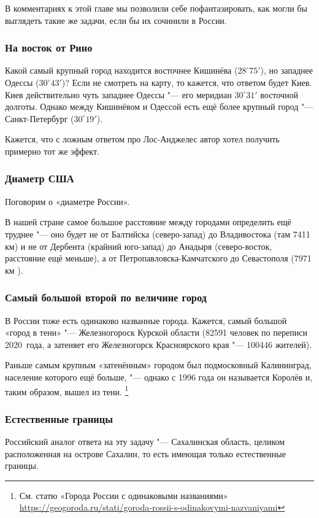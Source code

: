 \documentclass[twoside]{book}
\begin{document}
В комментариях к этой главе мы позволили себе пофантазировать, как могли бы выглядеть такие же задачи, если бы их сочинили в России.

\subsubsection*{На восток от Рино}
Какой самый крупный город находится восточнее Кишинёва ($28^\circ75'$), но западнее Одессы ($30^\circ43'$)? 
Если не смотреть на карту, то кажется, что ответом будет Киев. Киев действительно чуть западнее Одессы "--- его
меридиан $30^\circ31'$ восточной долготы.
Однако между Кишинёвом и Одессой есть ещё более крупный город "--- Санкт-Петербург
($30^\circ19'$).

Кажется, что с ложным ответом про Лос-Анджелес автор хотел получить примерно тот же эффект.


\subsubsection{Диаметр США}
Поговорим о «диаметре России». 

В нашей стране самое большое расстояние между городами определить ещё труднее "--- оно будет не от Балтийска 
(северо-запад) до Владивостока (там 7411 км) и не от Дербента (крайний юго-запад) до Анадыря (северо-восток, 
расстояние ещё меньше), а от Петропавловска-Камчатского до Севастополя (7971 км%
).


\subsubsection{Самый большой второй по величине город}
В России тоже есть одинаково названные города. 
Кажется, самый большой «город в тени» "--- Железногороск Курской области (82591 человек по переписи 2020~года, 
а затеняет его Железногорск Красноярского края "--- 100446 жителей). 

Раньше самым крупным «затенённым» городом был подмосковный Калининград, население которого ещё больше, "---
однако с 1996 года он называется Королёв и, таким образом, вышел из тени.%
\footnote{См. статю «Города России с одинаковыми названиями» \url{https://geogoroda.ru/stati/goroda-rossii-s-odinakovymi-nazvaniyami}}

\subsubsection{Естественные границы}
Российский аналог ответа на эту задачу "--- Сахалинская область, целиком расположенная на острове Сахалин,
то есть имеющая только естественные границы.
\end{document}
